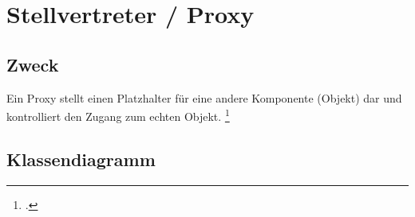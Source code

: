 \documentclass{lehramt-informatik-haupt}
\begin{document}

\chapter{Stellvertreter / Proxy}

\begin{quellen}
\item \cite{wiki:stellvertreter}
\item \cite[Seite 176-185]{gof}
\item \cite[Kapitel 8.4.4, Seite 256-262]{schatten}
\item \cite[Kapitel 5.5, Seite 89-92]{eilebrecht}
\item \cite[Kapitel 21, Seite 241-268]{siebler}
\end{quellen}

%

\section{Zweck}

Ein Proxy stellt einen Platzhalter für eine andere Komponente (Objekt)
dar und kontrolliert den Zugang zum echten Objekt.
\footcite[Seite 89]{eilebrecht}

%

\section{Klassendiagramm}

%
\end{document}
